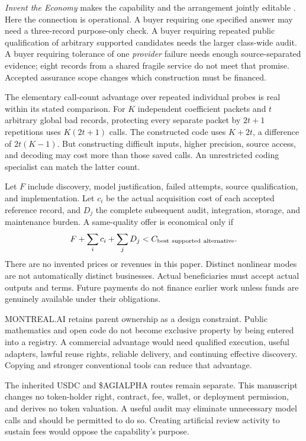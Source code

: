 \documentclass[11pt,letterpaper]{article}
\theoremstyle{remark}\newtheorem{remark}{Remark}[section]
\begin{document}
\emph{Invent the Economy} makes the capability and the arrangement jointly editable \citep{economy}. Here the connection is operational. A buyer requiring one specified answer may need a three-record purpose-only check. A buyer requiring repeated public qualification of arbitrary supported candidates needs the larger class-wide audit. A buyer requiring tolerance of one \emph{provider} failure needs enough source-separated evidence; eight records from a shared fragile service do not meet that promise. Accepted assurance scope changes which construction must be financed.

The elementary call-count advantage over repeated individual probes is real within its stated comparison. For $K$ independent coefficient packets and $t$ arbitrary global bad records, protecting every separate packet by $2t+1$ repetitions uses $K(2t+1)$ calls. The constructed code uses $K+2t$, a difference of $2t(K-1)$. But constructing difficult inputs, higher precision, source access, and decoding may cost more than those saved calls. An unrestricted coding specialist can match the latter count.

Let $F$ include discovery, model justification, failed attempts, source qualification, and implementation. Let $c_i$ be the actual acquisition cost of each accepted reference record, and $D_j$ the complete subsequent audit, integration, storage, and maintenance burden. A same-quality offer is economical only if
\begin{equation}
 F+\sum_i c_i+\sum_j D_j<C_{\rm best\ supported\ alternative}.
\end{equation}
There are no invented prices or revenues in this paper. Distinct nonlinear modes are not automatically distinct businesses. Actual beneficiaries must accept actual outputs and terms. Future payments do not finance earlier work unless funds are genuinely available under their obligations.

MONTREAL.AI retains parent ownership as a design constraint. Public mathematics and open code do not become exclusive property by being entered into a registry. A commercial advantage would need qualified execution, useful adapters, lawful reuse rights, reliable delivery, and continuing effective discovery. Copying and stronger conventional tools can reduce that advantage.

The inherited USDC and \$AGIALPHA routes remain separate. This manuscript changes no token-holder right, contract, fee, wallet, or deployment permission, and derives no token valuation. A useful audit may eliminate unnecessary model calls and should be permitted to do so. Creating artificial review activity to sustain fees would oppose the capability's purpose.
\end{document}
